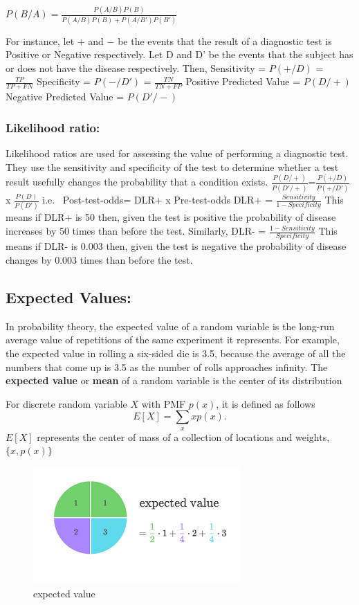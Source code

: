 \documentclass[]{article}
\begin{document}
\(P(B/A)=\frac {P(A/B)P(B)}{P(A/B)P(B)+P(A/B')P(B')}\)

For instance, let \(+\) and \(-\) be the events that the result of a
diagnostic test is Positive or Negative respectively. Let D and D' be
the events that the subject has or does not have the disease
respectively. Then, Sensitivity = \(P(+/D)\) = \(\frac {TP}{TP+FN}\)
Specificity = \(P(-/D')\) = \(\frac {TN}{TN+FP}\) Positive Predicted
Value = \(P(D/+)\) Negative Predicted Value = \(P(D'/-)\)

\hypertarget{likelihood-ratio}{%
\subsubsection{Likelihood ratio:}\label{likelihood-ratio}}

Likelihood ratios are used for assessing the value of performing a
diagnostic test. They use the sensitivity and specificity of the test to
determine whether a test result usefully changes the probability that a
condition exists. \(\frac{P(D/+)}{P(D'/+)}\)=\(\frac{P(+/D)}{P(+/D')}\)
x \(\frac{P(D)}{P(D')}\) i.e.~ Post-test-odds= DLR+ x Pre-test-odds DLR+
= \(\frac {Sensitivity}{1-Specificity}\) This means if DLR+ is 50 then,
given the test is positive the probability of disease increases by 50
times than before the test. Similarly, DLR- =
\(\frac {1-Sensitivity}{Specificity}\) This means if DLR- is 0.003 then,
given the test is negative the probability of disease changes by 0.003
times than before the test.

\hypertarget{expected-values}{%
\subsection{Expected Values:}\label{expected-values}}

In probability theory, the expected value of a random variable is the
long-run average value of repetitions of the same experiment it
represents. For example, the expected value in rolling a six-sided die
is 3.5, because the average of all the numbers that come up is 3.5 as
the number of rolls approaches infinity. The \textbf{expected value} or
\textbf{mean} of a random variable is the center of its distribution

For discrete random variable \(X\) with PMF \(p(x)\), it is defined as
follows \[
E[X] = \sum_x xp(x).
\] \(E[X]\) represents the center of mass of a collection of locations
and weights, \(\{x, p(x)\}\)

\begin{figure}
\centering
\includegraphics{expected.png}
\caption{expected value}
\end{figure}
\end{document}
